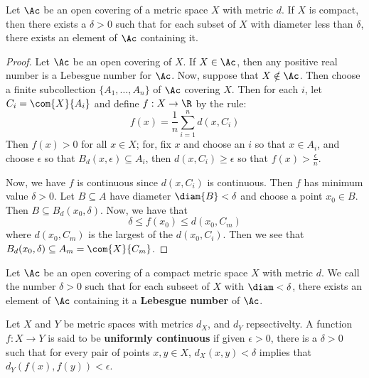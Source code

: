 \begin{lemma}\label{3.6.5}
    Let $\Ac$ be an open covering of a metric space $X$ with metric $d$. If $X$
    is compact, then there exists a  $\delta>0$ such that for each subset of
    $X$ with diameter less than  $\delta$, there exists an element of  $\Ac$
    containing it.
\end{lemma}
\begin{proof}
    Let $\Ac$ be an open covering of  $X$. If  $X \in \Ac$, then any positive
    real number is a Lebesgue number for  $\Ac$. Now, suppose that  $X \notin
    \Ac$. Then choose a finite subcollection  $\{A_1, \dots, A_n\}$ of $\Ac$
    covering  $X$. Then for each  $i$, let  $C_i=\com{X}{A_i}$ and define $f:X
    \rightarrow \R$ by the rule:
    \begin{equation}
        f(x) = \frac{1}{n}\sum_{i=1}^{n}{d(x,C_i)}
    \end{equation}
    Then $f(x)>0$ for all $x \in X$; for, fix $x$ and choose an  $i$ so that
    $x \in A_i$, and choose $\epsilon$ so that $B_d(x,\epsilon) \subseteq A_i$,
    then  $d(x,C_i) \geq \epsilon$ so that $f(x)>\frac{\epsilon}{n}$.

    Now, we have $f$ is continuous since  $d(x,C_i)$ is continuous. Then $f$ has
    minimum value  $\delta>0$. Let $B \subseteq A$ have diameter
    $\diam{B}<\delta$ and choose a point $x_0 \in B$. Then $B \subseteq
    B_d(x_0,\delta)$. Now, we have that
    \begin{equation*}
        \delta \leq f(x_0) \leq d(x_0,C_m)
    \end{equation*}
    where $d(x_0,C_m)$ is the largest of the $d(x_0,C_i)$. Then we see that
    $B_d(x_0,\delta) \subseteq A_m=\com{X}{C_m}$.
\end{proof}

\begin{definition}
    Let $\Ac$ be an open covering of a compact metric space $X$ with metric $d$.
    We call the number $\delta>0$ such that for each subseet of  $X$ with
    $\diam<\delta$, there exists an element of  $\Ac$ containing it a
    \textbf{Lebesgue number} of $\Ac$.
\end{definition}

\begin{definition}
    Let $X$ and  $Y$ be metric spaces with metrics $d_X$, and  $d_Y$
    repsectivelty. A function $f:X \rightarrow Y$ is said to be
    \textbf{uniformly continuous} if given $\epsilon>0$, there is a  $\delta>0$
    such that for every pair of points  $x,y \in X$, $d_X(x,y)<\delta$ implies
    that $d_Y(f(x),f(y))<\epsilon$.
\end{definition}

